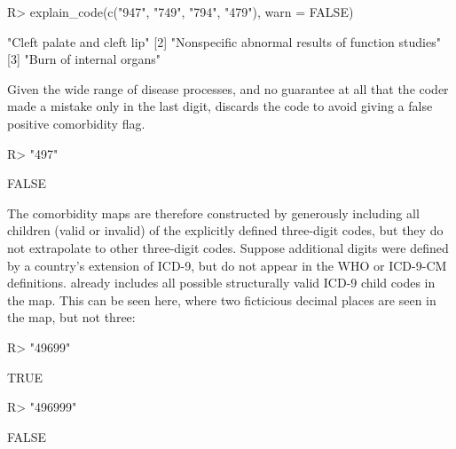 \documentclass[article]{jss}
\begin{document}
\begin{CodeChunk}

\begin{CodeInput}
R> explain_code(c("947", "749", "794", "479"), warn = FALSE)
\end{CodeInput}

\begin{CodeOutput}
[1] "Cleft palate and cleft lip"                      
[2] "Nonspecific abnormal results of function studies"
[3] "Burn of internal organs"                         
\end{CodeOutput}
\end{CodeChunk}

Given the wide range of disease processes, and no guarantee at all that
the coder made a mistake only in the last digit,  discards the
code to avoid giving a false positive comorbidity flag.

\begin{CodeChunk}

\begin{CodeInput}
R> "497" %
\end{CodeInput}

\begin{CodeOutput}
[1] FALSE
\end{CodeOutput}
\end{CodeChunk}

The comorbidity maps are therefore constructed by generously including
all children (valid or invalid) of the explicitly defined three-digit
codes, but they do not extrapolate to other three-digit codes. Suppose
additional digits were defined by a country's extension of ICD-9, but do
not appear in the WHO or ICD-9-CM definitions.  already
includes all possible structurally valid ICD-9 child codes in the map.
This can be seen here, where two ficticious decimal places are seen in
the map, but not three:

\begin{CodeChunk}

\begin{CodeInput}
R> "49699" %
\end{CodeInput}

\begin{CodeOutput}
[1] TRUE
\end{CodeOutput}

\begin{CodeInput}
R> "496999" %
\end{CodeInput}

\begin{CodeOutput}
[1] FALSE
\end{CodeOutput}
\end{CodeChunk}
\end{document}
